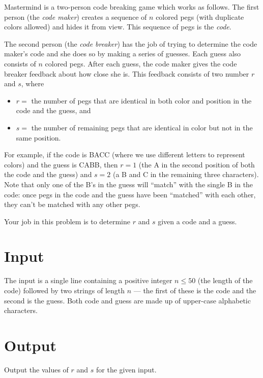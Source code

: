 
Mastermind is a two-person code breaking game which works as follows. The
first person (the {\em code maker}) creates a sequence of $n$ colored pegs (with
duplicate colors allowed) and hides it from view. This sequence of pegs is the
{\em code}.

The second person (the {\em code breaker}) has the job of trying to determine
the code maker's code and she does so by making a series of guesses. Each guess
also consists of $n$ colored pegs.  After each guess, the code maker gives the
code breaker feedback about how close she is. This feedback consists of two
number $r$ and $s$, where
\begin{itemize}
\item $r =$ the number of pegs that are identical in both color and position in
the code and the guess, and
\item $s =$ the number of remaining pegs that are identical in color but not in
the same position.
\end{itemize}
For example, if the code is BACC (where we use different letters to represent
colors) and the guess is CABB, then $r=1$ (the A in the second position of both
the code and the guess) and $s=2$ (a B and C in the remaining three characters).
Note that only one of the B's in the guess will ``match'' with the single B in
the code: once pegs in the code and the guess have been ``matched'' with each
other, they can't be matched with any other pegs.

Your job in this problem is to determine $r$ and $s$ given a code and a guess.

\section*{Input}

The input is a single line containing a positive integer $n \leq 50$ (the length
of the code) followed by two strings of length $n$ --- the first of these is the
code and the second is the guess. Both code and guess are made up of upper-case
alphabetic characters.

\section*{Output}

Output the values of $r$ and $s$ for the given input.


